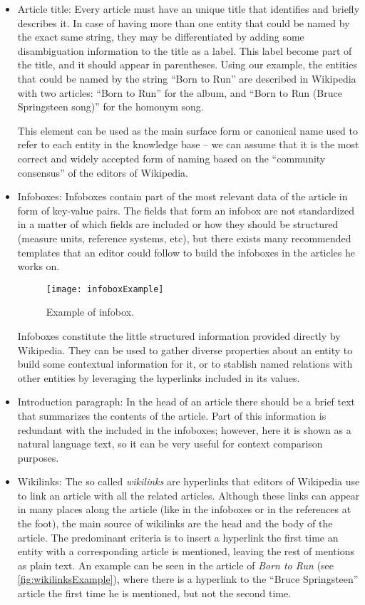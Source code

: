 \begin{itemize}
\item 
Article title: Every article must have an unique title that identifies and briefly describes it. In case of having more than one entity that could be named by the exact same string, they may be differentiated by adding some disambiguation information to the title as a label. This label become part of the title, and it should appear in parentheses. Using our example, the entities that could be named by the string ``Born to Run'' are described in Wikipedia with two articles: ``Born to Run'' for the album, and ``Born to Run (Bruce Springsteen song)'' for the homonym song.

This element can be used as the main surface form or canonical name used to refer to each entity in the knowledge base -- we can assume that it is the most correct and widely accepted form of naming based on the ``community consensus'' of the editors of Wikipedia.

\item Infoboxes: Infoboxes contain part of the most relevant data of the article in form of key-value pairs. The fields that form an infobox are not standardized in a matter of which fields are included or how they should be structured (measure units, reference systems, etc), but there exists many recommended templates that an editor could follow to build the infoboxes in the articles he works on.

\begin{figure}[!ht]
	\centering
	\texttt{[image: infoboxExample]}
	
	\caption{Example of infobox.}
	\label{fig:infoboxExample}
\end{figure}

Infoboxes constitute the little structured information provided directly by Wikipedia. They can be used to gather diverse properties about an entity to build some contextual information for it, or to stablish named relations with other entities by leveraging the hyperlinks included in its values.

\item Introduction paragraph: In the head of an article there should be a brief text that summarizes the contents of the article. Part of this information is redundant with the included in the infoboxes; however, here it is shown as a natural language text, so it can be very useful for context comparison purposes.

\item Wikilinks: The so called \emph{wikilinks} are hyperlinks that editors of Wikipedia use to link an article with all the related articles. Although these links can appear in many places along the article (like in the infoboxes or in the references at the foot), the main source of wikilinks are the head and the body of the article. The predominant criteria is to insert a hyperlink the first time an entity with a corresponding article is mentioned, leaving the rest of mentions as plain text. An example can be seen in the article of \textit{Born to Run} (see \autoref{fig:wikilinksExample}), where there is a hyperlink to the ``Bruce Springsteen'' article the first time he is mentioned, but not the second time.


\end{itemize}
